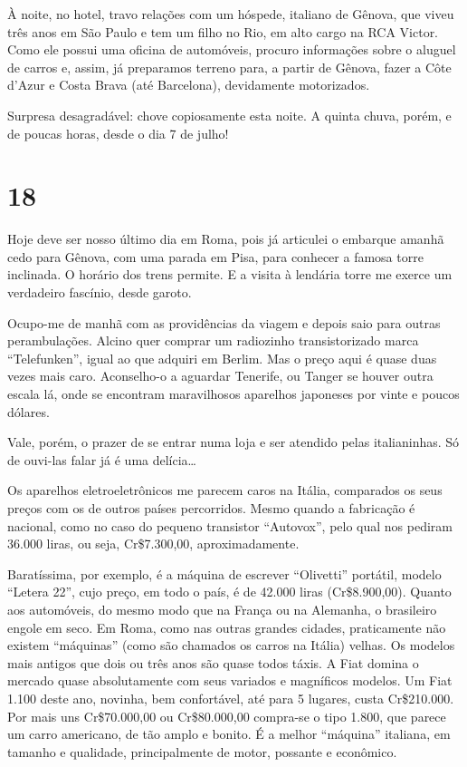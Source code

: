 À noite, no hotel, travo relações com um hóspede, italiano de Gênova, que viveu três anos em São Paulo e tem um filho no Rio, em alto cargo na RCA Victor. Como ele possui uma oficina de automóveis, procuro informações sobre o aluguel de carros e, assim, já preparamos terreno para, a partir de Gênova, fazer a Côte d’Azur e Costa Brava (até Barcelona), devidamente motorizados.

Surpresa desagradável: chove copiosamente esta noite. A quinta chuva, porém, e de poucas horas, desde o dia 7 de julho!

\section*{18 \adfflatleafright {}}
Hoje deve ser nosso último dia em Roma, pois já articulei o embarque amanhã cedo para Gênova, com uma parada em Pisa, para conhecer a famosa torre inclinada. O horário dos trens permite. E a visita à lendária torre me exerce um verdadeiro fascínio, desde garoto.

Ocupo-me de manhã com as providências da viagem e depois saio para outras perambulações. Alcino quer comprar um radiozinho transistorizado marca ``Telefunken'', igual ao que adquiri em Berlim. Mas o preço aqui é quase duas vezes mais caro. Aconselho-o a aguardar Tenerife, ou Tanger se houver outra escala lá, onde se encontram maravilhosos aparelhos japoneses por vinte e poucos dólares.

Vale, porém, o prazer de se entrar numa loja e ser atendido pelas italianinhas. Só de ouvi-las falar já é uma delícia\ldots

Os aparelhos eletroeletrônicos me parecem caros na Itália, comparados os seus preços com os de outros países percorridos. Mesmo quando a fabricação é nacional, como no caso do pequeno transistor ``Autovox'', pelo qual nos pediram 36.000 liras, ou seja, Cr\$7.300,00, aproximadamente.

Baratíssima, por exemplo, é a máquina de escrever ``Olivetti'' portátil, modelo ``Letera 22'', cujo preço, em todo o país, é de 42.000 liras (Cr\$8.900,00). Quanto aos automóveis, do mesmo modo que na França ou na Alemanha, o brasileiro engole em seco. Em Roma, como nas outras grandes cidades, praticamente não existem ``máquinas'' (como são chamados os carros na Itália) velhas. Os modelos mais antigos que dois ou três anos são quase todos táxis. A Fiat domina o mercado quase absolutamente com seus variados e magníficos modelos. Um Fiat 1.100 deste ano, novinha, bem confortável, até para 5 lugares, custa Cr\$210.000. Por mais uns Cr\$70.000,00 ou Cr\$80.000,00 compra-se o tipo 1.800, que parece um carro americano, de tão amplo e bonito. É a melhor ``máquina'' italiana, em tamanho e qualidade, principalmente de motor, possante e econômico.

